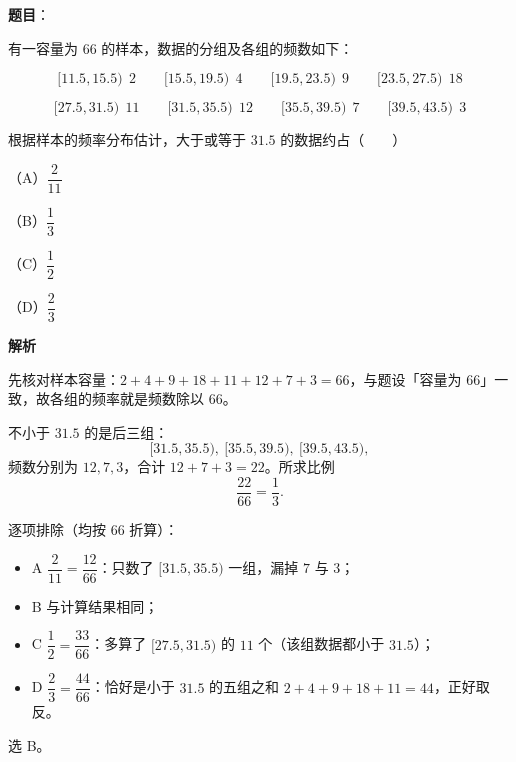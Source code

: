 \begin{answer}

\textbf{题目}：

有一容量为 $66$ 的样本，数据的分组及各组的频数如下：

\nopagebreak[4]
\[[11.5,15.5)\ \ 2 \qquad [15.5,19.5)\ \ 4 \qquad [19.5,23.5)\ \ 9 \qquad [23.5,27.5)\ \ 18\]

\nopagebreak[4]
\[[27.5,31.5)\ \ 11 \qquad [31.5,35.5)\ \ 12 \qquad [35.5,39.5)\ \ 7 \qquad [39.5,43.5)\ \ 3\]

根据样本的频率分布估计，大于或等于 $31.5$ 的数据约占\mbox{（　　）}

（A）$\dfrac{2}{11}$

（B）$\dfrac13$

（C）$\dfrac12$

（D）$\dfrac23$

\textbf{解析}

先核对样本容量：$2+4+9+18+11+12+7+3=66$，与题设「容量为 $66$」一致，故各组的频率就是频数除以 $66$。

不小于 $31.5$ 的是后三组：
\nopagebreak[4]
\[
[31.5,35.5),\ [35.5,39.5),\ [39.5,43.5),
\]
频数分别为 $12,7,3$，合计 $12+7+3=22$。所求比例
\nopagebreak[4]
\[
\frac{22}{66}=\frac13.
\]

逐项排除（均按 $66$ 折算）：

\begin{itemize}
\item A $\dfrac{2}{11}=\dfrac{12}{66}$：只数了 $[31.5,35.5)$ 一组，漏掉 $7$ 与 $3$；
\item B 与计算结果相同；
\item C $\dfrac12=\dfrac{33}{66}$：多算了 $[27.5,31.5)$ 的 $11$ 个（该组数据都小于 $31.5$）；
\item D $\dfrac23=\dfrac{44}{66}$：恰好是小于 $31.5$ 的五组之和 $2+4+9+18+11=44$，正好取反。
\end{itemize}

选 B。


\end{answer}
